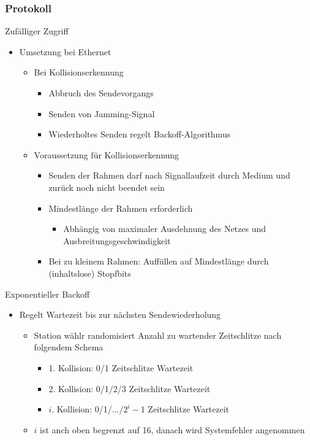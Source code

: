     \subsubsection{Protokoll}
      Zufälliger Zugriff
      \begin{itemize}
        \item Umsetzung bei Ethernet
          \begin{itemize}
            \item Bei Kollisionserkennung
              \begin{itemize}
                \item Abbruch des Sendevorgangs
                \item Senden von Jamming-Signal
                \item Wiederholtes Senden regelt Backoff-Algorithmus
              \end{itemize}
            \item Voraussetzung für Kollisionserkennung
              \begin{itemize}
                \item Senden der Rahmen darf nach Signallaufzeit durch Medium und zurück noch nicht
                  beendet sein
                \item Mindestlänge der Rahmen erforderlich
                  \begin{itemize}
                    \item Abhängig von maximaler Ausdehnung des Netzes und 
                      Ausbreitungsgeschwindigkeit
                  \end{itemize}
                \item Bei zu kleinem Rahmen: Auffüllen auf Mindestlänge durch (inhaltslose) Stopfbits
              \end{itemize}
          \end{itemize}
      \end{itemize}
      Exponentieller Backoff
      \begin{itemize}
        \item Regelt Wartezeit bis zur nächsten Sendewiederholung
          \begin{itemize}
            \item Station wählr randomisiert Anzahl zu wartender Zeitschlitze nach folgendem Schema
              \begin{itemize}
                \item 1. Kollision: 0/1 Zeitschlitze Wartezeit
                \item 2. Kollision: 0/1/2/3 Zeitschlitze Wartezeit
                \item $i$. Kollision: 0/1/.../$2^i-1$ Zeitschlitze Wartezeit
              \end{itemize}
            \item $i$ ist anch oben begrenzt auf 16, danach wird Systemfehler angenommen
          \end{itemize}
      \end{itemize}
